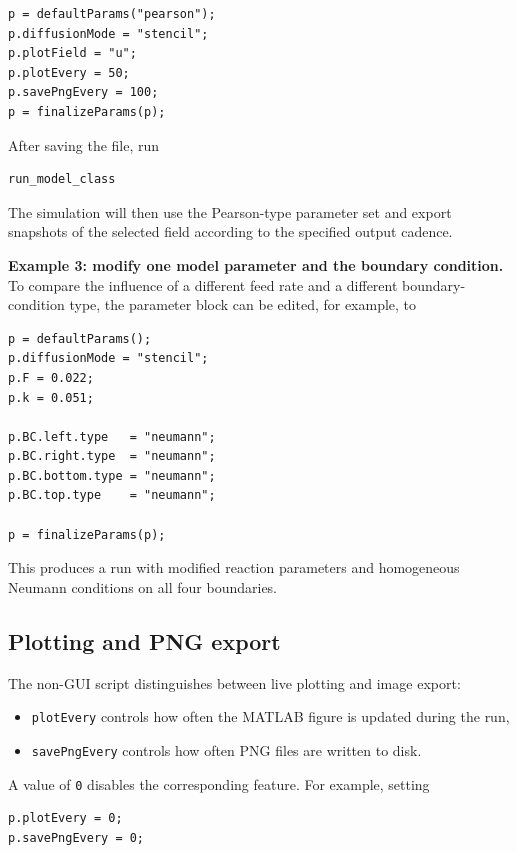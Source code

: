 \begin{verbatim}
p = defaultParams("pearson");
p.diffusionMode = "stencil";
p.plotField = "u";
p.plotEvery = 50;
p.savePngEvery = 100;
p = finalizeParams(p);
\end{verbatim}

After saving the file, run

\begin{verbatim}
run_model_class
\end{verbatim}

The simulation will then use the Pearson-type parameter set and export snapshots of the selected field according to the specified output cadence.

\medskip

\textbf{Example 3: modify one model parameter and the boundary condition.}  
To compare the influence of a different feed rate and a different boundary-condition type, the parameter block can be edited, for example, to

\begin{verbatim}
p = defaultParams();
p.diffusionMode = "stencil";
p.F = 0.022;
p.k = 0.051;

p.BC.left.type   = "neumann";
p.BC.right.type  = "neumann";
p.BC.bottom.type = "neumann";
p.BC.top.type    = "neumann";

p = finalizeParams(p);
\end{verbatim}

This produces a run with modified reaction parameters and homogeneous Neumann conditions on all four boundaries.

\subsection*{Plotting and PNG export}

The non-GUI script distinguishes between live plotting and image export:

\begin{itemize}
    \item \texttt{plotEvery} controls how often the MATLAB figure is updated during the run,
    \item \texttt{savePngEvery} controls how often PNG files are written to disk.
\end{itemize}

A value of \texttt{0} disables the corresponding feature. For example, setting

\begin{verbatim}
p.plotEvery = 0;
p.savePngEvery = 0;
\end{verbatim}

